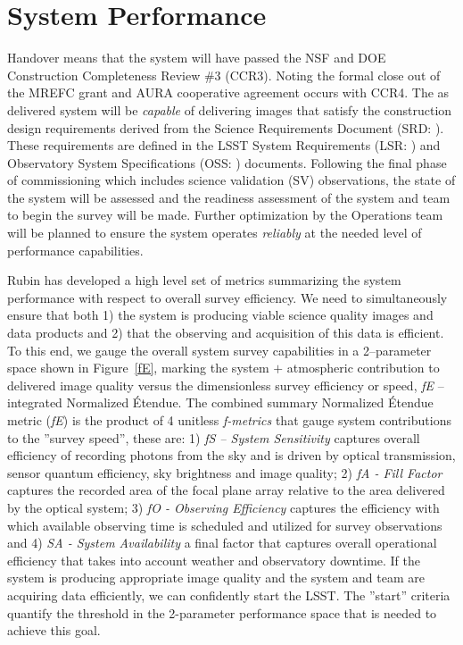 \section{System Performance}{\label{secSysperf}}
  
Handover means that the system will have passed the NSF and DOE Construction Completeness Review \#3 (CCR3).  Noting the formal close out of the MREFC grant and AURA cooperative agreement occurs with CCR4. The as delivered system will be {\it capable} of delivering images that satisfy the construction design requirements derived from the Science Requirements Document (SRD: \cite{LPM-17}).  These requirements are defined in the LSST System Requirements (LSR: \cite{LSE-29}) and Observatory System Specifications (OSS: \cite{LSE-30}) documents. Following the final phase of commissioning which includes science validation (SV) observations, the state of the system will be assessed and the readiness assessment of the system and team to begin the survey will be made. Further optimization by the Operations team will be planned to ensure the system operates {\it reliably} at the needed level of performance capabilities. 

Rubin has developed a high level set of metrics summarizing the system performance with respect to overall survey efficiency. We need to simultaneously ensure that both 1) the system is producing viable science quality images and data products and 2) that the observing and acquisition of this data is efficient.  To this end, we gauge the overall system survey capabilities in a 2--parameter space shown in Figure~\ref{fE}, marking the system $+$ atmospheric contribution to delivered image quality versus the dimensionless survey efficiency or speed, {\it fE} -- integrated Normalized \'{E}tendue.  The combined summary Normalized \'{E}tendue metric ({\it fE}) is the product of 4 unitless {\it f-metrics} that gauge system contributions to the ''survey speed'', these are: 1) { \it fS -- System Sensitivity} captures overall efficiency of recording photons from the sky and is driven by optical transmission, sensor quantum efficiency, sky brightness and image quality; 2) {\it fA - Fill Factor} captures the recorded area of the focal plane array relative to the area delivered by the optical system; 3) {\it fO - Observing Efficiency} captures the efficiency with which available observing time is scheduled and utilized for survey observations and 4) {\it SA - System Availability} a final factor that captures overall operational efficiency that takes into account weather and observatory downtime.   If the system is producing appropriate image quality and the system and team are acquiring data efficiently, we can confidently start the LSST.  The ''start'' criteria quantify the threshold in the 2-parameter performance space that is needed to achieve this goal.


